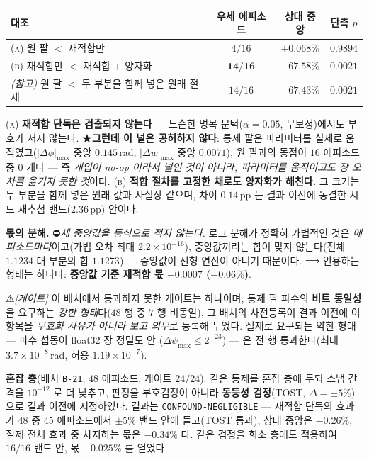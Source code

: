 \documentclass[11pt]{report}
\numberwithin{equation}{chapter}
\numberwithin{figure}{chapter}
\numberwithin{table}{chapter}
\begin{document}
\begin{center}
\begin{tabular}{lccc}
\toprule
대조 & 우세 에피소드 & 상대 중앙 & 단측 $p$ \\
\midrule
\textsc{(a)} 원 팔 $<$ 재적합만 & $4/16$ & $+0.068\%$ & $0.9894$ \\
\textsc{(b)} 재적합만 $<$ 재적합 $+$ 양자화 & $\mathbf{14/16}$ & $\mathbf{-67.58\%}$ & $\mathbf{0.0021}$ \\
\midrule
\emph{(참고)} 원 팔 $<$ 두 부분을 함께 넣은 원래 절제 & $14/16$ & $-67.43\%$ & $0.0021$ \\
\bottomrule
\end{tabular}
\end{center}

\textsc{(a)} \textbf{재적합 단독은 검출되지 않는다} --- 느슨한 명목 문턱($\alpha = 0.05$,
무보정)에서도 부호가 서지 않는다. ★\textbf{그런데 이 널은 공허하지 않다}: 통제 팔은
파라미터를 실제로 움직였고($|\Delta\phi|_{\max}$ 중앙 $0.145$\,rad,
$|\Delta w|_{\max}$ 중앙 $0.0071$), 원 팔과의 동점이 $16$ 에피소드 중 $0$ 개다 --- 즉
\emph{개입이 no-op 이라서 널인 것이 아니라, 파라미터를 움직이고도 장 오차를 옮기지
못한 것}이다.
\textsc{(b)} \textbf{적합 절차를 고정한 채로도 양자화가 해친다.} 그 크기는 두 부분을
함께 넣은 원래 값과 사실상 같으며, 차이 $0.14$\,pp 는 결과 이전에 동결한 시드 재추첨
밴드($2.36$\,pp) 안이다.

\textbf{몫의 분해.} ⛔\emph{세 중앙값을 등식으로 적지 않는다.} 로그 분해가 정확히
가법적인 것은 \emph{에피소드마다}이고(가법 오차 최대 $2.2\times10^{-16}$), 중앙값끼리는
합이 맞지 않는다(전체 $1.1234$ 대 부분의 합 $1.1273$) --- 중앙값이 선형 연산이 아니기
때문이다. ⟹ 인용하는 형태는 하나다: \textbf{중앙값 기준 재적합 몫 $-0.0007$
($-0.06\%$)}.

⚠\emph{[게이트]} 이 배치에서 통과하지 못한 게이트는 하나이며, 통제 팔 파수의
\textbf{비트 동일성}을 요구하는 \emph{강한 형태}다($48$ 행 중 $7$ 행 비동일). 그 배치의
사전등록이 결과 이전에 이 항목을 \emph{무효화 사유가 아니라 보고 의무}로 등록해 두었다.
실제로 요구되는 약한 형태 --- 파수 섭동이 float32 장 정밀도 안
($\Delta\psi_{\max} \le 2^{-23}$) --- 은 전 행 통과한다(최대 $3.7\times10^{-8}$\,rad,
허용 $1.19\times10^{-7}$).

\textbf{혼잡 층}(배치 \texttt{B-21}; $48$ 에피소드, 게이트 $24/24$). 같은 통제를 혼잡
층에 두되 스냅 간격을 $10^{-12}$ 로 더 낮추고, 판정을 부호검정이 아니라
\textbf{동등성 검정}(TOST, $\Delta = \pm 5\%$)으로 결과 이전에 지정하였다. 결과는
\texttt{CONFOUND-NEGLIGIBLE} --- 재적합 단독의 효과가 $48$ 중 $45$ 에피소드에서
$\pm 5\%$ 밴드 안에 들고(TOST 통과), 상대 중앙은 $-0.26\%$, 절제 전체 효과 중 차지하는
몫은 $-0.34\%$ 다. 같은 검정을 희소 층에도 적용하여 $16/16$ 밴드 안, 몫 $-0.025\%$ 를
얻었다.
\end{document}
